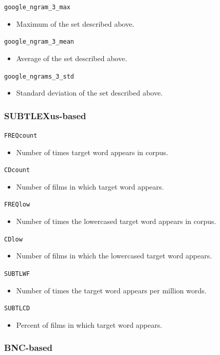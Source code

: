 \documentclass[11pt,a4paper]{article}
\begin{document}
\texttt{google\_ngram\_3\_max}
\begin{itemize}
  \item Maximum of the set described above.
\end{itemize}
\texttt{google\_ngram\_3\_mean}
\begin{itemize}
  \item Average of the set described above.
\end{itemize}
\texttt{google\_ngrams\_3\_std}
\begin{itemize}
  \item Standard deviation of the set described above.
\end{itemize}

\subsubsection{SUBTLEXus-based}

\texttt{FREQcount}
\begin{itemize}
  \item Number of times target word appears in corpus.
\end{itemize}
\texttt{CDcount}
\begin{itemize}
  \item Number of films in which target word appears.
\end{itemize}
\texttt{FREQlow}
\begin{itemize}
  \item Number of times the lowercased target word appears in corpus.
\end{itemize}
\texttt{CDlow}
\begin{itemize}
  \item Number of films in which the lowercased target word appears.
\end{itemize}
\texttt{SUBTLWF}
\begin{itemize}
  \item Number of times the target word appears per million words.
\end{itemize}
\texttt{SUBTLCD}
\begin{itemize}
  \item Percent of films in which target word appears.
\end{itemize}

\subsubsection{BNC-based}
\end{document}
